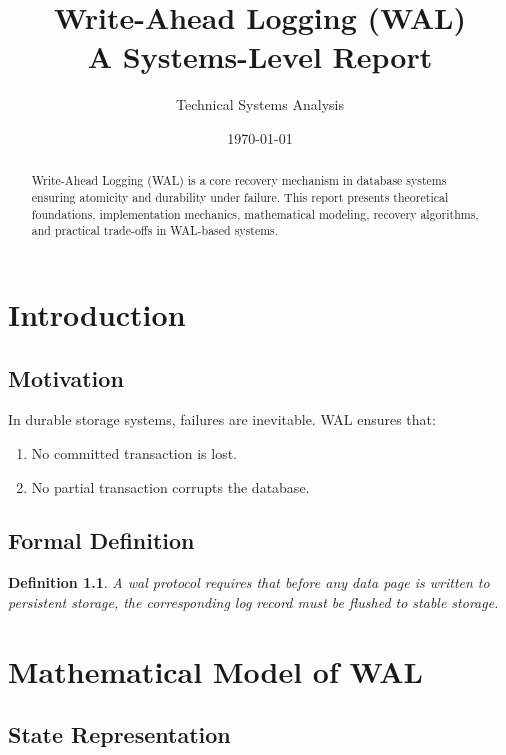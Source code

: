 \documentclass[12pt,a4paper]{report}
\title{\Huge Write-Ahead Logging (WAL) \\ \Large A Systems-Level Report}
\author{Technical Systems Analysis}
\date{\today}
\newtheorem{definition}{Definition}[chapter]
\begin{document}
\maketitle
\tableofcontents
\newpage

\begin{abstract}
Write-Ahead Logging (WAL) is a core recovery mechanism in database systems ensuring atomicity and durability under failure. This report presents theoretical foundations, implementation mechanics, mathematical modeling, recovery algorithms, and practical trade-offs in WAL-based systems.
\end{abstract}

\chapter{Introduction}

\section{Motivation}

In durable storage systems, failures are inevitable. WAL ensures that:

\begin{enumerate}
    \item No committed transaction is lost.
    \item No partial transaction corrupts the database.
\end{enumerate}

\section{Formal Definition}

\begin{definition}
A \gls{wal} protocol requires that before any data page is written to persistent storage, the corresponding log record must be flushed to stable storage.
\end{definition}

\chapter{Mathematical Model of WAL}

\section{State Representation}
\end{document}
